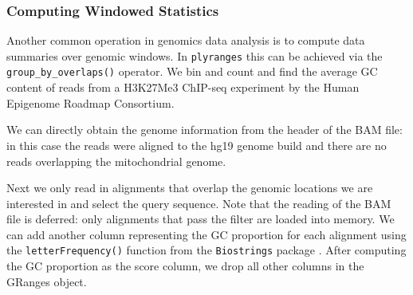 \documentclass[]{article}
\newenvironment{Shaded}{\begin{snugshade}}{\end{snugshade}}
\newcommand{\DataTypeTok}[1]{\textcolor[rgb]{0.13,0.29,0.53}{#1}}
\newcommand{\KeywordTok}[1]{\textcolor[rgb]{0.13,0.29,0.53}{\textbf{#1}}}
\newcommand{\NormalTok}[1]{#1}
\newcommand{\OperatorTok}[1]{\textcolor[rgb]{0.81,0.36,0.00}{\textbf{#1}}}
\newcommand{\OtherTok}[1]{\textcolor[rgb]{0.56,0.35,0.01}{#1}}
\newcommand{\StringTok}[1]{\textcolor[rgb]{0.31,0.60,0.02}{#1}}
\begin{document}
\hypertarget{computing-windowed-statistics}{%
\subsubsection{Computing Windowed
Statistics}\label{computing-windowed-statistics}}

Another common operation in genomics data analysis is to compute data
summaries over genomic windows. In \texttt{plyranges} this can be
achieved via the \texttt{group\_by\_overlaps()} operator. We bin and
count and find the average GC content of reads from a H3K27Me3 ChIP-seq
experiment by the Human Epigenome Roadmap Consortium.

We can directly obtain the genome information from the header of the BAM
file: in this case the reads were aligned to the hg19 genome build and
there are no reads overlapping the mitochondrial genome.

\begin{Shaded}
\end{Shaded}

Next we only read in alignments that overlap the genomic locations we
are interested in and select the query sequence. Note that the reading
of the BAM file is deferred: only alignments that pass the filter are
loaded into memory. We can add another column representing the GC
proportion for each alignment using the \texttt{letterFrequency()}
function from the \texttt{Biostrings} package \cite{R-biostrings}. After
computing the GC proportion as the score column, we drop all other
columns in the GRanges object.

\begin{Shaded}
\end{Shaded}
\end{document}
